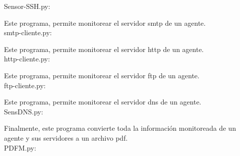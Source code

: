 Sensor-SSH.py:

\noindent
Este programa, permite monitorear el servidor smtp de un agente.\\
smtp-cliente.py:

\noindent
Este programa, permite monitorear el servidor http de un agente.\\
http-cliente.py:

\noindent
Este programa, permite monitorear el servidor ftp de un agente.\\
ftp-cliente.py:

\noindent
Este programa, permite monitorear el servidor dns de un agente.\\
SensDNS.py:

\noindent
Finalmente, este programa convierte toda la información monitoreada de un agente y sus servidores a un archivo pdf.\\
PDFM.py:
